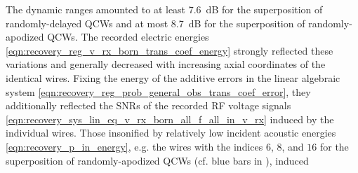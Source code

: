 The dynamic ranges amounted to
at least \SI{7.6}{\deci\bel} for
the superposition of
randomly-delayed \acp{QCW} and
at most \SI{8.7}{\deci\bel} for
the superposition of
randomly-apodized \acp{QCW}.
The recorded electric energies
\eqref{eqn:recovery_reg_v_rx_born_trans_coef_energy} strongly reflected
these variations and generally decreased with
increasing axial coordinates of
the identical wires.
Fixing
the energy of
the additive errors in
the linear algebraic system
\eqref{eqn:recovery_reg_prob_general_obs_trans_coef_error},
they additionally reflected
the \acp{SNR} of
the recorded \ac{RF} voltage signals
\eqref{eqn:recovery_sys_lin_eq_v_rx_born_all_f_all_in_v_rx} induced by
the individual wires.
Those insonified by
relatively low incident acoustic energies
\eqref{eqn:recovery_p_in_energy}, e.g.
the wires with
the indices $6$, $8$, and $16$ for
the superposition of
randomly-apodized \acp{QCW}
(cf. blue bars in ), induced
